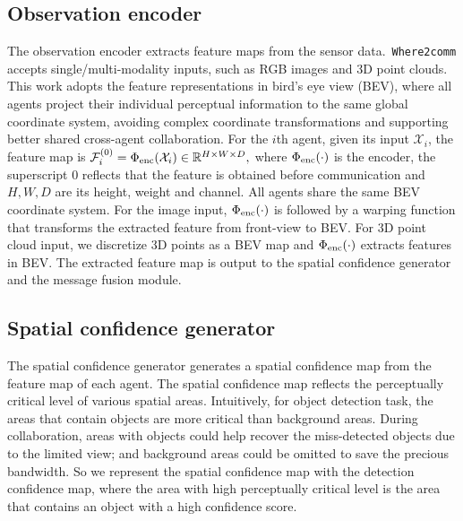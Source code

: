 \subsection{Observation encoder}
\label{sec:Encoder}
\vspace{-2mm}
The observation encoder extracts feature maps from the sensor data.~\texttt{Where2comm} accepts single/multi-modality inputs, such as RGB images and 3D point clouds. This work adopts the feature representations in bird's eye view (BEV), where all agents project their individual perceptual information to the same global coordinate system, avoiding complex coordinate transformations and supporting better shared cross-agent collaboration. For the $i$th agent, given its input $\mathcal{X}_i$, the feature map is 
$ 
\mathcal{F}_i^{(0)} = \Phi_{\rm enc}(\mathcal{X}_i) \in \mathbb{R}^{H \times W \times D},$
where $\Phi_{\rm enc}(\cdot)$ is the encoder, the superscript $0$ reflects that the feature is obtained before communication and $H,W,D$ are its height, weight and channel. All agents share the same BEV coordinate system. For the image input, $\Phi_{\rm enc}(\cdot)$ is followed by a warping function that transforms the extracted feature from front-view to BEV. For 3D point cloud input, we discretize 3D points as a BEV map and $\Phi_{\rm enc}(\cdot)$ extracts features in BEV. The extracted feature map is output to the spatial confidence generator and the message fusion module.


\vspace{-2mm}
\subsection{Spatial confidence generator}
\label{sec:Generator}
\vspace{-2mm}
The spatial confidence generator generates a spatial confidence map from the feature map of each agent. The spatial confidence map reflects the perceptually critical level of various spatial areas. Intuitively, for object detection task, the areas that contain objects are more critical than background areas. During collaboration, areas with objects could help recover the miss-detected objects due to the limited view; and background areas could be omitted to save the precious bandwidth. So we represent the spatial confidence map with the detection confidence map, where the area with high perceptually critical level is the area that contains an object with a high confidence score.


